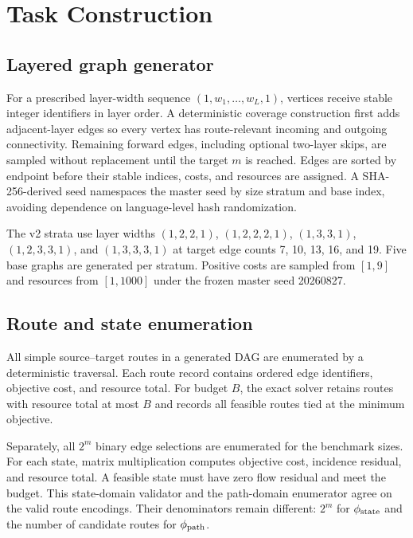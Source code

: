 \section{Task Construction}
\label{app:tasks}

\subsection{Layered graph generator}

For a prescribed layer-width sequence
$(1,w_1,\ldots,w_L,1)$, vertices receive stable integer identifiers in layer
order. A deterministic coverage construction first adds adjacent-layer edges
so every vertex has route-relevant incoming and outgoing connectivity.
Remaining forward edges, including optional two-layer skips, are sampled
without replacement until the target $m$ is reached. Edges are sorted by
endpoint before their stable indices, costs, and resources are assigned. A
SHA-256-derived seed namespaces the master seed by size stratum and base index,
avoiding dependence on language-level hash randomization.

The v2 strata use layer widths $(1,2,2,1)$,
$(1,2,2,2,1)$, $(1,3,3,1)$, $(1,2,3,3,1)$, and
$(1,3,3,3,1)$ at target edge counts 7, 10, 13, 16, and 19. Five base graphs
are generated per stratum. Positive costs are sampled from $[1,9]$ and
resources from $[1,1000]$ under the frozen master seed 20260827.

\subsection{Route and state enumeration}

All simple source--target routes in a generated DAG are enumerated by a
deterministic traversal. Each route record contains ordered edge identifiers,
objective cost, and resource total. For budget $B$, the exact solver retains
routes with resource total at most $B$ and records all feasible routes tied at
the minimum objective.

Separately, all $2^m$ binary edge selections are enumerated for the benchmark
sizes. For each state, matrix multiplication computes objective cost,
incidence residual, and resource total. A feasible state must have zero flow
residual and meet the budget. This state-domain validator and the path-domain
enumerator agree on the valid route encodings. Their denominators remain
different: $2^m$ for $\phi_{\mathrm{state}}$ and the number of candidate routes for
$\phi_{\mathrm{path}}$.

